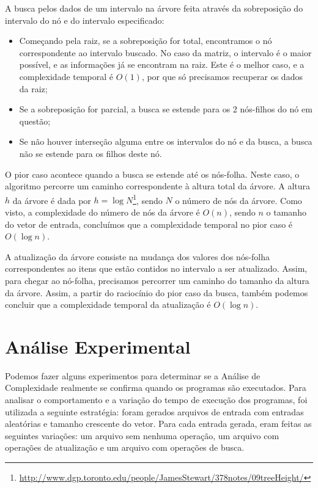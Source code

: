 \documentclass{article}
\begin{document}
A busca pelos dados de um intervalo na árvore feita através da sobreposição do intervalo do nó e do intervalo especificado:

\begin{itemize}
\item Começando pela raiz, se a sobreposição for total, encontramos o nó correspondente ao intervalo buscado. No caso da matriz, o intervalo é o maior possível, e as informações já se encontram na raiz. Este é o melhor caso, e a complexidade temporal é $O(1)$, por que só precisamos recuperar os dados da raiz;
\item Se a sobreposição for parcial, a busca se estende para os 2 nós-filhos do nó em questão;
\item Se não houver interseção alguma entre os intervalos do nó e da busca, a busca não se estende para os filhos deste nó.
\end{itemize}

O pior caso acontece quando a busca se estende até os nós-folha. Neste caso, o algoritmo percorre um caminho correspondente à altura total da árvore. A altura $h$ da árvore é dada por $h = \log N$\footnote{\url{http://www.dgp.toronto.edu/people/JamesStewart/378notes/09treeHeight/}}, sendo $N$ o número de nós da árvore. Como visto, a complexidade do número de nós da árvore é $O(n)$, sendo $n$ o tamanho do vetor de entrada, concluímos que a complexidade temporal no pior caso é $O(\log n)$.

A atualização da árvore consiste na mudança dos valores dos nós-folha correspondentes ao itens que estão contidos no intervalo a ser atualizado. Assim, para chegar ao nó-folha, precisamos percorrer um caminho do tamanho da altura da árvore. Assim, a partir do raciocínio do pior caso da busca, também podemos concluir que a complexidade temporal da atualização é $O(\log n)$.

\section{Análise Experimental}

Podemos fazer alguns experimentos para determinar se a Análise de Complexidade realmente se confirma quando os programas são executados. Para analisar o comportamento e a variação do tempo de execução dos programas, foi utilizada a seguinte estratégia: foram gerados arquivos de entrada com entradas aleatórias e tamanho crescente do vetor. Para cada entrada gerada, eram feitas as seguintes variações: um arquivo sem nenhuma operação, um arquivo com operações de atualização e um arquivo com operações de busca.
\end{document}
